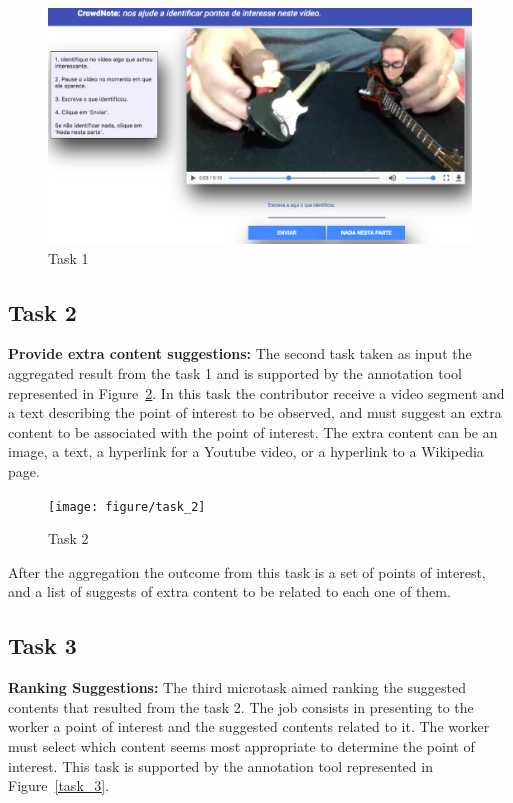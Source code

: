 \begin{figure}[h!]
	\centerline{\includegraphics[scale=0.22] {figure/task_1}}
	\caption{Task 1}
	\label{task_1}
\end{figure}

\subsection{Task 2}

\textbf{Provide extra content suggestions:} The second task taken as input the aggregated result from the task 1 and is supported by the annotation tool represented in Figure~\ref{task_2}. In this task the contributor receive a video segment and a text describing  the point of interest to be observed, and must suggest an extra content to be associated with the point of interest. The extra content can be an image, a text, a hyperlink for a Youtube video, or a hyperlink to a Wikipedia page. 

\begin{figure}[h!]
	\centerline{\texttt{[image: figure/task\_2]}}
	\caption{Task 2}
	\label{task_2}
\end{figure}

After the aggregation the outcome from this task is a set of points of interest, and a list of suggests of extra content to be related to each one of them.


\subsection{Task 3}

\textbf{Ranking Suggestions:} The third microtask aimed ranking the suggested contents that resulted from the task 2. The job consists in presenting to the worker a point of interest and the suggested contents related to it. The worker must select which content seems most appropriate to determine the point of interest. This task is supported by the annotation tool represented in Figure~\ref{task_3}.

